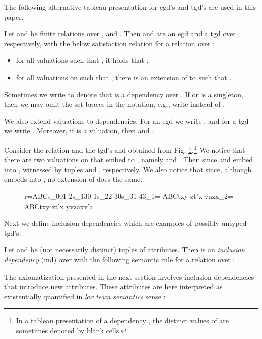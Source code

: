 \documentclass[envcountset]{llncs}
\begin{document}
The following alternative tableau presentation for egd's and tgd's are used in this paper. \begin{definition}
Let  and  be finite relations over , and . Then  and  are an egd and a tgd over , respectively, with the below satisfaction relation for a relation   over :
\begin{itemize}
\item   for all valuations  such that , it holds that  .
\item    for all valuations  on  such that , there is an extension  of  to  such that . 
\end{itemize}
\end{definition}
Sometimes we write  to denote that  is a dependency over . 
If  or  is a singleton, then we may omit the set braces in the notation, e.g., write  instead of . 

We also extend valuations to dependencies. For an egd  we write , and for a tgd   we write . Moreover,  if  is a valuation, then  and .


\begin{ex}
Consider the relation  and the tgd's  and  obtained from Fig. \ref{kuv}.\footnote{In a tableau presentation of a dependency , the distinct values of  are sometimes denoted by blank cells.}
We notice that there are two valuations on   that embed  to , namely  and . Then  since  and  embed  into , witnessed by tuples  and , respectively. We also notice that  since, although  embeds  into , no extension of  does the same.
\end{ex}

\begin{figure}[h]
\begin{center}
r=ABCs_001 2s_130 1s_22 30s_31 43\sigma_1= ABCtxy zt'x yuzx\sigma_2= ABCtxy zt'x yvzaxv'a\caption{\label{kuv}}



\end{center}
\end{figure}



Next we define inclusion dependencies which are examples of possibly untyped tgd's. 
\begin{definition}
Let  and  be (not necessarily distinct) tuples of attributes. Then  is an \emph{inclusion dependency} (ind) over  with the following semantic rule for a relation  over :

\end{definition}
The axiomatization presented in the next section involves inclusion dependencies that introduce new attributes. These attributes are here interpreted as existentially quantified in \emph{lax team semantics} sense \cite{galliani12}:
\end{document}
